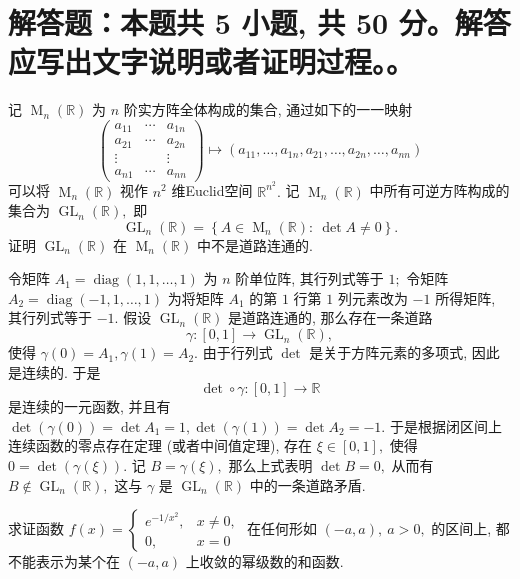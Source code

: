 \section{解答题：本题共 5 小题, 共 50 分。解答应写出文字说明或者证明过程。。}


\begin{question}[points = 8]
记 $\operatorname{M}_n(\mathbb{R})$ 为 $n$ 阶实方阵全体构成的集合, 通过如下的一一映射
\[\begin{pmatrix}
a_{11} & \cdots & a_{1n} \\
a_{21} & \cdots & a_{2n} \\
\vdots & & \vdots \\
a_{n1} & \cdots & a_{nn}
\end{pmatrix} \mapsto (a_{11}, \dots, a_{1n}, a_{21}, \dots, a_{2n}, \dots, a_{nn})\]
可以将 $\operatorname{M}_n(\mathbb{R})$ 视作 $n^2$ 维Euclid空间 $\mathbb{R}^{n^2}.$ 记 $\operatorname{M}_n(\mathbb{R})$ 中所有可逆方阵构成的集合为 $\operatorname{GL}_n(\mathbb{R}),$ 即
\[\operatorname{GL}_n(\mathbb{R}) = \left\{ A \in \operatorname{M}_n(\mathbb{R}): ~ \det A \neq 0 \right\}.\]
证明 $\operatorname{GL}_n(\mathbb{R})$ 在 $\operatorname{M}_n(\mathbb{R})$ 中不是道路连通的.

\end{question}

\begin{solution}
令矩阵 $A_1 = \operatorname{diag}(1, 1, \dots, 1)$ 为 $n$ 阶单位阵, 其行列式等于 $1;$ 令矩阵 $A_2 = \operatorname{diag}(-1, 1, \dots, 1)$ 为将矩阵 $A_1$ 的第 $1$ 行第 $1$ 列元素改为 $-1$ 所得矩阵, 其行列式等于 $-1.$ 假设 $\operatorname{GL}_n(\mathbb{R})$ 是道路连通的, 那么存在一条道路
\[\gamma: [0, 1] \longrightarrow \operatorname{GL}_n(\mathbb{R}),\]
使得 $\gamma(0) = A_1, \gamma(1) = A_2.$
由于行列式 $\det$ 是关于方阵元素的多项式, 因此是连续的. 于是
\[\det\circ\gamma: [0, 1] \longrightarrow \mathbb{R}\]
是连续的一元函数, 并且有 $\det(\gamma(0)) = \det A_1 = 1, \det(\gamma(1)) = \det A_2 = -1.$ 于是根据闭区间上连续函数的零点存在定理 (或者中间值定理), 存在 $\xi \in [0, 1],$ 使得 $0 = \det(\gamma(\xi)).$ 记 $B = \gamma(\xi),$ 那么上式表明 $\det B = 0,$ 从而有 $B \not\in \operatorname{GL}_n(\mathbb{R}),$ 这与 $\gamma$ 是 $\operatorname{GL}_n(\mathbb{R})$ 中的一条道路矛盾.
\end{solution}

\begin{question}[points = 10]
求证函数 $f(x) = \begin{cases}
e^{-1/x^2}, & x \neq 0, \\
0, & x = 0
\end{cases}$ 在任何形如 $(-a, a), ~ a > 0,$ 的区间上, 都不能表示为某个在 $(-a, a)$ 上收敛的幂级数的和函数.

\end{question}

